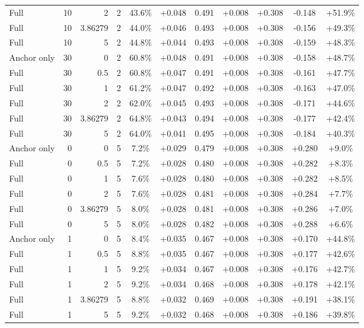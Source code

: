 \begin{table}[htbp]
\begin{tabular}{lrrrccccccc}
Full & 10 & 2 & 2 & 43.6\% & +0.048 & 0.491 & +0.008 & +0.308 & -0.148 & +51.9\% \\
Full & 10 & 3.86279 & 2 & 44.0\% & +0.046 & 0.493 & +0.008 & +0.308 & -0.156 & +49.3\% \\
Full & 10 & 5 & 2 & 44.8\% & +0.044 & 0.493 & +0.008 & +0.308 & -0.159 & +48.3\% \\
Anchor only & 30 & 0 & 2 & 60.8\% & +0.048 & 0.491 & +0.008 & +0.308 & -0.158 & +48.7\% \\
Full & 30 & 0.5 & 2 & 60.8\% & +0.047 & 0.491 & +0.008 & +0.308 & -0.161 & +47.7\% \\
Full & 30 & 1 & 2 & 61.2\% & +0.047 & 0.492 & +0.008 & +0.308 & -0.163 & +47.0\% \\
Full & 30 & 2 & 2 & 62.0\% & +0.045 & 0.493 & +0.008 & +0.308 & -0.171 & +44.6\% \\
Full & 30 & 3.86279 & 2 & 64.8\% & +0.043 & 0.494 & +0.008 & +0.308 & -0.177 & +42.4\% \\
Full & 30 & 5 & 2 & 64.0\% & +0.041 & 0.495 & +0.008 & +0.308 & -0.184 & +40.3\% \\
Anchor only & 0 & 0 & 5 & 7.2\% & +0.029 & 0.479 & +0.008 & +0.308 & +0.280 & +9.0\% \\
Full & 0 & 0.5 & 5 & 7.2\% & +0.028 & 0.480 & +0.008 & +0.308 & +0.282 & +8.3\% \\
Full & 0 & 1 & 5 & 7.6\% & +0.028 & 0.480 & +0.008 & +0.308 & +0.282 & +8.5\% \\
Full & 0 & 2 & 5 & 7.6\% & +0.028 & 0.481 & +0.008 & +0.308 & +0.284 & +7.7\% \\
Full & 0 & 3.86279 & 5 & 8.0\% & +0.028 & 0.481 & +0.008 & +0.308 & +0.286 & +7.0\% \\
Full & 0 & 5 & 5 & 8.0\% & +0.028 & 0.482 & +0.008 & +0.308 & +0.288 & +6.6\% \\
Anchor only & 1 & 0 & 5 & 8.4\% & +0.035 & 0.467 & +0.008 & +0.308 & +0.170 & +44.8\% \\
Full & 1 & 0.5 & 5 & 8.8\% & +0.035 & 0.467 & +0.008 & +0.308 & +0.177 & +42.6\% \\
Full & 1 & 1 & 5 & 9.2\% & +0.034 & 0.467 & +0.008 & +0.308 & +0.176 & +42.7\% \\
Full & 1 & 2 & 5 & 9.2\% & +0.034 & 0.468 & +0.008 & +0.308 & +0.178 & +42.1\% \\
Full & 1 & 3.86279 & 5 & 8.8\% & +0.032 & 0.469 & +0.008 & +0.308 & +0.191 & +38.1\% \\
Full & 1 & 5 & 5 & 9.2\% & +0.032 & 0.468 & +0.008 & +0.308 & +0.186 & +39.8\% \\

\end{tabular}
\end{table}
